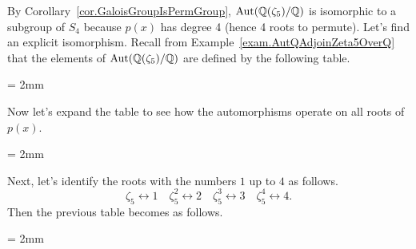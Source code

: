 \begin{example}
By Corollary~\ref{cor.GaloisGroupIsPermGroup}, $\operatorname{Aut}(\mathbb{Q}(\zeta_5)/\mathbb{Q})$ is isomorphic to a subgroup of $S_4$ because $p(x)$ has degree 4 (hence 4 roots to permute). Let's find an explicit isomorphism. Recall from Example~\ref{exam.AutQAdjoinZeta5OverQ} that the elements of $\operatorname{Aut}(\mathbb{Q}(\zeta_5)/\mathbb{Q})$ are defined by the following table.
\begin{center}
\tabulinesep = 2mm
\end{center}
Now let's expand the table to see how the automorphisms operate on all roots of $p(x)$.
\begin{center}
\tabulinesep = 2mm
\end{center}
Next, let's identify the roots with the numbers $1$ up to $4$ as follows.
\[\zeta_5 \leftrightarrow 1\quad \zeta_5^2 \leftrightarrow 2 \quad \zeta_5^3 \leftrightarrow 3 \quad \zeta_5^4 \leftrightarrow 4.\]
Then the previous table becomes as follows.
\begin{center}
\tabulinesep = 2mm
\end{center}
\end{example}
